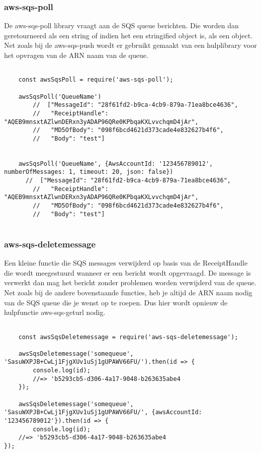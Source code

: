 \subsubsection{aws-sqs-poll}
De aws-sqs-poll library vraagt aan de SQS queue berichten. Die worden dan geretourneerd als een string of indien het een stringified object is, als een object. Net zoals bij de aws-sqs-push wordt er gebruikt gemaakt van een hulplibrary voor het opvragen van de ARN naam van de queue.

\begin{lstlisting}[caption=Voorbeeld hoe berichten worden opgehaald van de SQS queue]

	const awsSqsPoll = require('aws-sqs-poll');

	awsSqsPoll('QueueName')
    	//  ["MessageId": "28f61fd2-b9ca-4cb9-879a-71ea8bce4636",
    	//   "ReceiptHandle": "AQEB9mnsxtAZlwnDERxn3yADAP96QRe0KPbqaKXLvvchqmD4jAr",
    	//   "MD5OfBody": "098f6bcd4621d373cade4e832627b4f6",
    	//   "Body": "test"]


	awsSqsPoll('QueueName', {AwsAccountId: '123456789012', numberOfMessages: 1, timeout: 20, json: false})
  	  //  ["MessageId": "28f61fd2-b9ca-4cb9-879a-71ea8bce4636",
    	//   "ReceiptHandle": "AQEB9mnsxtAZlwnDERxn3yADAP96QRe0KPbqaKXLvvchqmD4jAr",
    	//   "MD5OfBody": "098f6bcd4621d373cade4e832627b4f6",
    	//   "Body": "test"]
	
\end{lstlisting}
\clearpage
\subsubsection{aws-sqs-deletemessage}
Een kleine functie die SQS messages verwijderd op basis van de ReceiptHandle die wordt meegestuurd wanneer er een bericht wordt opgevraagd. De message is verwerkt dan mag het bericht zonder problemen worden verwijderd van de queue. Net zoals bij de andere bovenstaande functies, heb je altijd de ARN naam nodig van de SQS queue die je wenst op te roepen. Dus hier wordt opnieuw de hulpfunctie aws-sqs-geturl nodig.

\begin{lstlisting}[caption=Voorbeeld hoe een bericht wordt verwijderd van SQS nadat het is verwerkt]

	const awsSqsDeletemessage = require('aws-sqs-deletemessage');

	awsSqsDeletemessage('somequeue', 'SasuWXPJB+CwLj1FjgXUv1uSj1gUPAWV66FU/').then(id => {
		console.log(id);
		//=> 'b5293cb5-d306-4a17-9048-b263635abe4
	});

	awsSqsDeletemessage('somequeue', 'SasuWXPJB+CwLj1FjgXUv1uSj1gUPAWV66FU/', {awsAccountId: '123456789012'}).then(id => {
		console.log(id);
	//=> 'b5293cb5-d306-4a17-9048-b263635abe4
});
	
\end{lstlisting}

